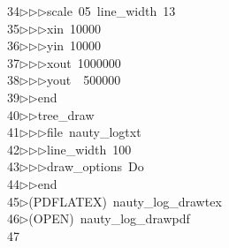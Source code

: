 \begin{tabbing}
34\>$\triangleright$\>$\triangleright$\>$\triangleright$\>scale\ 05\ line\_width\ 13\ \\[0pt]
35\>$\triangleright$\>$\triangleright$\>$\triangleright$\>xin\ 10000\ \\[0pt]
36\>$\triangleright$\>$\triangleright$\>$\triangleright$\>yin\ 10000\ \\[0pt]
37\>$\triangleright$\>$\triangleright$\>$\triangleright$\>xout\ 1000000\ \\[0pt]
38\>$\triangleright$\>$\triangleright$\>$\triangleright$\>yout\ \ 500000\ \\[0pt]
39\>$\triangleright$\>$\triangleright$\>end\ \\[0pt]
40\>$\triangleright$\>$\triangleright$\>tree\_draw\ \\[0pt]
41\>$\triangleright$\>$\triangleright$\>$\triangleright$\>file\ nauty\_logtxt\ \\[0pt]
42\>$\triangleright$\>$\triangleright$\>$\triangleright$\>line\_width\ 100\ \\[0pt]
43\>$\triangleright$\>$\triangleright$\>$\triangleright$\>draw\_options\ Do\ \\[0pt]
44\>$\triangleright$\>$\triangleright$\>end\\[0pt]
45\>$\triangleright$\>(PDFLATEX)\ nauty\_log\_drawtex\\[0pt]
46\>$\triangleright$\>(OPEN)\ nauty\_log\_drawpdf\\[0pt]
47\>\end{tabbing}
